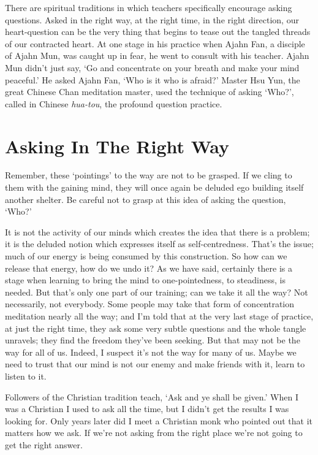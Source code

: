There are spiritual traditions in which teachers specifically encourage
asking questions. Asked in the right way, at the right time, in the
right direction, our heart-question can be the very thing that begins to
tease out the tangled threads of our contracted heart. At one stage in
his practice when Ajahn Fan, a disciple of Ajahn Mun, was caught up in
fear, he went to consult with his teacher. Ajahn Mun didn’t just say,
‘Go and concentrate on your breath and make your mind peaceful.’ He
asked Ajahn Fan, ‘Who is it who is afraid?’ Master Hsu Yun\cite{hsu-yun}, the
great Chinese Chan meditation master, used the technique of asking
‘Who?’, called in Chinese \emph{hua-tou}, the profound question practice.

\section{Asking In The Right Way}

Remember, these ‘pointings’ to the way are not to be grasped. If we
cling to them with the gaining mind, they will once again be deluded ego
building itself another shelter. Be careful not to grasp at this idea of
asking the question, ‘Who?’

It is not the activity of our minds which creates the idea that there is
a problem; it is the deluded notion which expresses itself as
self-centredness. That’s the issue; much of our energy is being consumed
by this construction. So how can we release that energy, how do we undo
it? As we have said, certainly there is a stage when learning to bring
the mind to one-pointedness, to steadiness, is needed. But that’s only
one part of our training; can we take it all the way? Not necessarily,
not everybody. Some people may take that form of concentration
meditation nearly all the way; and I’m told that at the very last stage
of practice, at just the right time, they ask some very subtle questions
and the whole tangle unravels; they find the freedom they’ve been
seeking. But that may not be the way for all of us. Indeed, I suspect
it’s not the way for many of us. Maybe we need to trust that our mind is
not our enemy and make friends with it, learn to listen to it.

Followers of the Christian tradition teach, ‘Ask and ye shall be given.’
When I was a Christian I used to ask all the time, but I didn’t get the
results I was looking for. Only years later did I meet a Christian monk
who pointed out that it matters how we ask. If we’re not asking from the
right place we’re not going to get the right answer.

